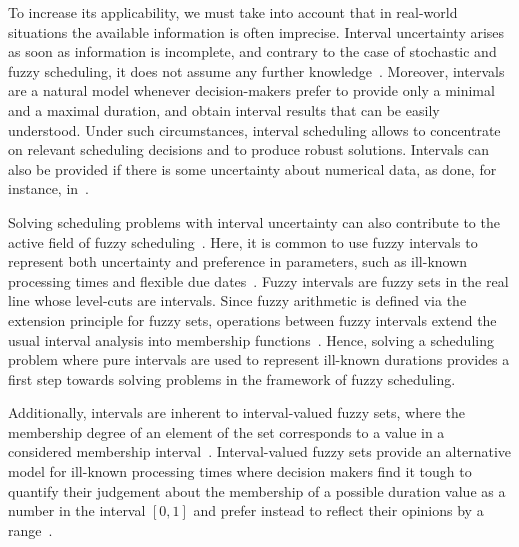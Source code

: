 \documentclass[icae]{iosart2x}
\newcommand{\reviewed}[1]{#1} %
\begin{document}
To increase its applicability, we must take into account that in real-world situations the available information is often imprecise. Interval uncertainty arises as soon as information is incomplete, and contrary to the case of stochastic and fuzzy scheduling, it does not assume any further knowledge~\cite{Allahverdi2014,Allahverdi2022}. Moreover, intervals are a natural model whenever decision-makers prefer to provide only a minimal and a maximal duration, and obtain interval results that can be easily understood.  Under such circumstances, interval scheduling allows to concentrate on relevant scheduling decisions and to produce robust solutions. \reviewed{Intervals can also be provided if there is some uncertainty about numerical data, as done, for instance, in~\cite{Bustince2010ignorance}.}

\reviewed{Solving scheduling problems with interval uncertainty can also contribute to the active field of fuzzy scheduling~\cite{Behnamian2016}. Here, it is common to use fuzzy intervals to represent both uncertainty and preference in parameters, such as ill-known processing times and flexible due dates~\cite{Dubois2003c}. Fuzzy intervals are fuzzy sets in the real line whose level-cuts are intervals. Since fuzzy arithmetic is defined via the extension principle for fuzzy sets, operations between fuzzy intervals extend the usual interval analysis into membership functions~\cite{Lodwick2003special,Dubois2000b}. Hence, solving a scheduling problem where pure intervals are used to represent ill-known durations provides a first step towards solving problems in the framework of fuzzy scheduling.}

\reviewed{Additionally, intervals are inherent to interval-valued fuzzy sets, where the membership degree of an element of the set corresponds to a value in a considered membership interval~\cite{Bustince2016historical}.  Interval-valued fuzzy sets provide an alternative model for ill-known processing times where decision makers find it tough to quantify their judgement about the membership of a possible duration value as a number in the interval $[0,1]$ and prefer instead to reflect their opinions by a range~\cite{Lin2002,Dorfeshan2020new}.}
\end{document}
